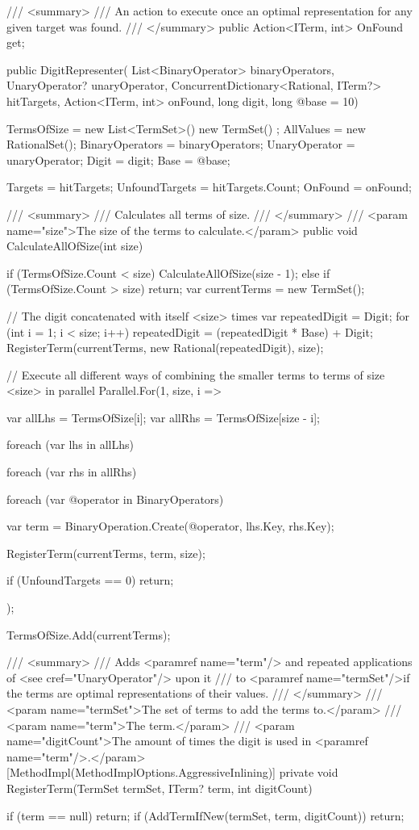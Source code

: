\documentclass{article}
\theoremstyle{nonumberplain}
\begin{document}
\begin{lstcs}[]
{    /// <summary>
    /// An action to execute once an optimal representation for any given target was found.
    /// </summary>
    public Action<ITerm, int> OnFound { get; }

    public DigitRepresenter(
        List<BinaryOperator> binaryOperators,
        UnaryOperator? unaryOperator,
        ConcurrentDictionary<Rational, ITerm?> hitTargets,
        Action<ITerm, int> onFound,
        long digit,
        long @base = 10)
    {
        TermsOfSize = new List<TermSet>() { new TermSet() };
        AllValues = new RationalSet();
        BinaryOperators = binaryOperators;
        UnaryOperator = unaryOperator;
        Digit = digit;
        Base = @base;

        Targets = hitTargets;
        UnfoundTargets = hitTargets.Count;
        OnFound = onFound;
    }

    /// <summary>
    /// Calculates all terms of size.
    /// </summary>
    /// <param name="size">The size of the terms to calculate.</param>
    public void CalculateAllOfSize(int size)
    {
        if (TermsOfSize.Count < size) CalculateAllOfSize(size - 1);
        else if (TermsOfSize.Count > size) return;
        var currentTerms = new TermSet();

        // The digit concatenated with itself <size> times
        var repeatedDigit = Digit;
        for (int i = 1; i < size; i++) repeatedDigit = (repeatedDigit * Base) + Digit;
        RegisterTerm(currentTerms, new Rational(repeatedDigit), size);

        // Execute all different ways of combining the smaller terms to terms of size <size> in parallel
        Parallel.For(1, size, i =>
        {
            var allLhs = TermsOfSize[i];
            var allRhs = TermsOfSize[size - i];

            foreach (var lhs in allLhs)
            {
                foreach (var rhs in allRhs)
                {
                    foreach (var @operator in BinaryOperators)
                    {
                        var term = BinaryOperation.Create(@operator, lhs.Key, rhs.Key);

                        RegisterTerm(currentTerms, term, size);

                        if (UnfoundTargets == 0) return;
                    }
                }
            }
        });

        TermsOfSize.Add(currentTerms);
    }

    /// <summary>
    /// Adds <paramref name="term"/> and repeated applications of <see cref="UnaryOperator"/> upon it
    /// to <paramref name="termSet"/>if the terms are optimal representations of their values.
    /// </summary>
    /// <param name="termSet">The set of terms to add the terms to.</param>
    /// <param name="term">The term.</param>
    /// <param name="digitCount">The amount of times the digit is used in <paramref name="term"/>.</param>
    [MethodImpl(MethodImplOptions.AggressiveInlining)]
    private void RegisterTerm(TermSet termSet, ITerm? term, int digitCount)
    {
        if (term == null) return;
        if (AddTermIfNew(termSet, term, digitCount)) return;

}}
\end{lstcs}
\end{document}
